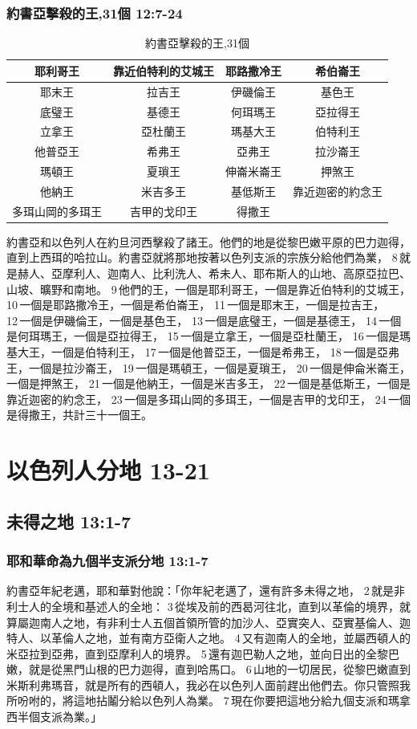 \subsubsection{約書亞擊殺的王,31個 12:7-24}
 \begin{table}[H]
\centering
\begin{tabular}{|c|c|c|c|}
\hline
\hline
耶利哥王&靠近伯特利的艾城王 & 耶路撒冷王& 希伯崙王 \\\hline
耶末王&拉吉王& 伊磯倫王&基色王 \\\hline
底璧王&基德王& 何珥瑪王 &亞拉得王  \\\hline
立拿王&亞杜蘭王 &瑪基大王&伯特利王  \\\hline
他普亞王&希弗王& 亞弗王&拉沙崙王 \\\hline
瑪頓王&夏瑣王 &伸崙米崙王&押煞王 \\\hline
他納王&米吉多王 &基低斯王&靠近迦密的約念王 \\\hline
多珥山岡的多珥王&吉甲的戈印王 &得撒王 & \\\hline
\end{tabular}
\caption{約書亞擊殺的王,31個}
\end{table}
約書亞和以色列人在約旦河西擊殺了諸王。他們的地是從黎巴嫩平原的巴力迦得，直到上西珥的哈拉山。約書亞就將那地按著以色列支派的宗族分給他們為業， 8 就是赫人、亞摩利人、迦南人、比利洗人、希未人、耶布斯人的山地、高原亞拉巴、山坡、曠野和南地。 9 他們的王，一個是耶利哥王，一個是靠近伯特利的艾城王， 10 一個是耶路撒冷王，一個是希伯崙王， 11 一個是耶末王，一個是拉吉王， 12 一個是伊磯倫王，一個是基色王， 13 一個是底璧王，一個是基德王， 14 一個是何珥瑪王，一個是亞拉得王， 15 一個是立拿王，一個是亞杜蘭王， 16 一個是瑪基大王，一個是伯特利王， 17 一個是他普亞王，一個是希弗王， 18 一個是亞弗王，一個是拉沙崙王， 19 一個是瑪頓王，一個是夏瑣王， 20 一個是伸侖米崙王，一個是押煞王， 21 一個是他納王，一個是米吉多王， 22 一個是基低斯王，一個是靠近迦密的約念王， 23 一個是多珥山岡的多珥王，一個是吉甲的戈印王， 24 一個是得撒王，共計三十一個王。

\section{以色列人分地 13-21 }
\subsection{未得之地 13:1-7}
\subsubsection{耶和華命為九個半支派分地 13:1-7}
約書亞年紀老邁，耶和華對他說：「你年紀老邁了，還有許多未得之地， 2 就是非利士人的全境和基述人的全地： 3 從埃及前的西曷河往北，直到以革倫的境界，就算屬迦南人之地，有非利士人五個首領所管的加沙人、亞實突人、亞實基倫人、迦特人、以革倫人之地，並有南方亞衛人之地。 4 又有迦南人的全地，並屬西頓人的米亞拉到亞弗，直到亞摩利人的境界。 5 還有迦巴勒人之地，並向日出的全黎巴嫩，就是從黑門山根的巴力迦得，直到哈馬口。 6 山地的一切居民，從黎巴嫩直到米斯利弗瑪音，就是所有的西頓人，我必在以色列人面前趕出他們去。你只管照我所吩咐的，將這地拈鬮分給以色列人為業。 7 現在你要把這地分給九個支派和瑪拿西半個支派為業。」

